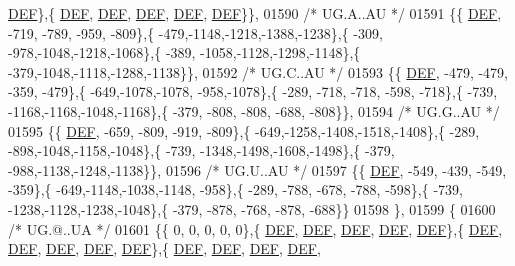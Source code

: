 \begin{DoxyCode}
      \mbox{\hyperlink{1_88_84__epars_8h_a397419fc12b37ed479c8abb9d444d843}{DEF}}\},\{  \mbox{\hyperlink{1_88_84__epars_8h_a397419fc12b37ed479c8abb9d444d843}{DEF}},  \mbox{\hyperlink{1_88_84__epars_8h_a397419fc12b37ed479c8abb9d444d843}{DEF}},  \mbox{\hyperlink{1_88_84__epars_8h_a397419fc12b37ed479c8abb9d444d843}{DEF}},  \mbox{\hyperlink{1_88_84__epars_8h_a397419fc12b37ed479c8abb9d444d843}{DEF}},  \mbox{\hyperlink{1_88_84__epars_8h_a397419fc12b37ed479c8abb9d444d843}{DEF}}\}\},
01590 \textcolor{comment}{/* UG.A..AU */}
01591 \{\{  \mbox{\hyperlink{1_88_84__epars_8h_a397419fc12b37ed479c8abb9d444d843}{DEF}}, -719, -789, -959, -809\},\{ -479,-1148,-1218,-1388,-1238\},\{ -309, -978,-1048,-1218,-1068\},\{ -389,
      -1058,-1128,-1298,-1148\},\{ -379,-1048,-1118,-1288,-1138\}\},
01592 \textcolor{comment}{/* UG.C..AU */}
01593 \{\{  \mbox{\hyperlink{1_88_84__epars_8h_a397419fc12b37ed479c8abb9d444d843}{DEF}}, -479, -479, -359, -479\},\{ -649,-1078,-1078, -958,-1078\},\{ -289, -718, -718, -598, -718\},\{ -739,
      -1168,-1168,-1048,-1168\},\{ -379, -808, -808, -688, -808\}\},
01594 \textcolor{comment}{/* UG.G..AU */}
01595 \{\{  \mbox{\hyperlink{1_88_84__epars_8h_a397419fc12b37ed479c8abb9d444d843}{DEF}}, -659, -809, -919, -809\},\{ -649,-1258,-1408,-1518,-1408\},\{ -289, -898,-1048,-1158,-1048\},\{ -739,
      -1348,-1498,-1608,-1498\},\{ -379, -988,-1138,-1248,-1138\}\},
01596 \textcolor{comment}{/* UG.U..AU */}
01597 \{\{  \mbox{\hyperlink{1_88_84__epars_8h_a397419fc12b37ed479c8abb9d444d843}{DEF}}, -549, -439, -549, -359\},\{ -649,-1148,-1038,-1148, -958\},\{ -289, -788, -678, -788, -598\},\{ -739,
      -1238,-1128,-1238,-1048\},\{ -379, -878, -768, -878, -688\}\}
01598 \},
01599 \{
01600 \textcolor{comment}{/* UG.@..UA */}
01601 \{\{    0,    0,    0,    0,    0\},\{  \mbox{\hyperlink{1_88_84__epars_8h_a397419fc12b37ed479c8abb9d444d843}{DEF}},  \mbox{\hyperlink{1_88_84__epars_8h_a397419fc12b37ed479c8abb9d444d843}{DEF}},  \mbox{\hyperlink{1_88_84__epars_8h_a397419fc12b37ed479c8abb9d444d843}{DEF}},  \mbox{\hyperlink{1_88_84__epars_8h_a397419fc12b37ed479c8abb9d444d843}{DEF}},  \mbox{\hyperlink{1_88_84__epars_8h_a397419fc12b37ed479c8abb9d444d843}{DEF}}\},\{  
      \mbox{\hyperlink{1_88_84__epars_8h_a397419fc12b37ed479c8abb9d444d843}{DEF}},  \mbox{\hyperlink{1_88_84__epars_8h_a397419fc12b37ed479c8abb9d444d843}{DEF}},  \mbox{\hyperlink{1_88_84__epars_8h_a397419fc12b37ed479c8abb9d444d843}{DEF}},  \mbox{\hyperlink{1_88_84__epars_8h_a397419fc12b37ed479c8abb9d444d843}{DEF}},  \mbox{\hyperlink{1_88_84__epars_8h_a397419fc12b37ed479c8abb9d444d843}{DEF}}\},\{  \mbox{\hyperlink{1_88_84__epars_8h_a397419fc12b37ed479c8abb9d444d843}{DEF}},  \mbox{\hyperlink{1_88_84__epars_8h_a397419fc12b37ed479c8abb9d444d843}{DEF}},  \mbox{\hyperlink{1_88_84__epars_8h_a397419fc12b37ed479c8abb9d444d843}{DEF}},  \mbox{\hyperlink{1_88_84__epars_8h_a397419fc12b37ed479c8abb9d444d843}{DEF}},  

\end{DoxyCode}
